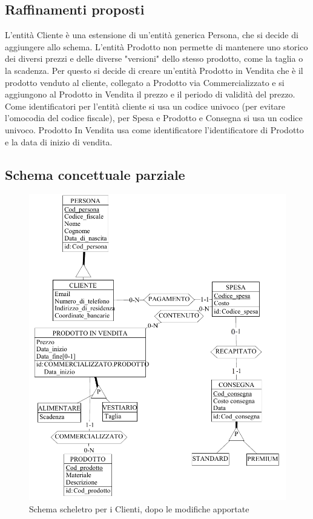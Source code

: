 \documentclass[a4paper,12pt]{report}
\begin{document}
\subsection{Raffinamenti proposti}
L'entità Cliente è una estensione di un'entità generica Persona, che si decide di aggiungere allo schema. 
L'entità Prodotto non permette di mantenere uno storico dei diversi prezzi e delle diverse "versioni" dello stesso prodotto, come la taglia o la scadenza. 
Per questo si decide di creare un'entità Prodotto in Vendita che è il prodotto venduto al cliente, collegato a Prodotto via Commercializzato e si aggiungono al Prodotto in Vendita il prezzo e il periodo di validità del prezzo. 
Come identificatori per l'entità cliente si usa un codice univoco (per evitare l'omocodia del codice fiscale), per Spesa e Prodotto e Consegna si usa un codice univoco. Prodotto In Vendita usa come identificatore l'identificatore di Prodotto e la data di inizio di vendita.
\subsection{Schema concettuale parziale}
\begin{figure}[H]
	\centering{}
	\includegraphics[width=\textwidth]{img/SchemaConcettuale-Clienti2.pdf}
	\caption{Schema scheletro per i Clienti, dopo le modifiche apportate}
\end{figure}
\end{document}
